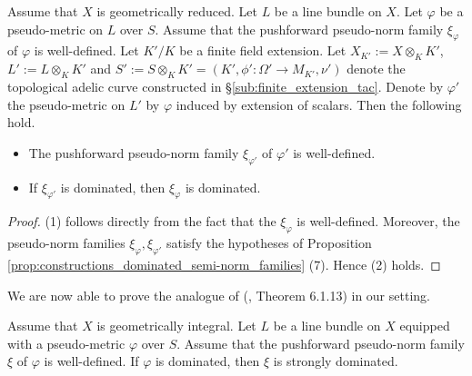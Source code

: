 \documentclass [11pt,reqno]{amsart}
\newcommand{\1}{\mathmybb{1}}
\begin{document}
\begin{proposition}
\label{prop:CM_4.1.18}
Assume that $X$ is geometrically reduced. Let $L$ be a line bundle on $X$. Let $\varphi$ be a pseudo-metric on $L$ over $S$. Assume that the pushforward pseudo-norm family $\xi_{\varphi}$ of $\varphi$ is well-defined. Let $K'/K$ be a finite field extension. Let $X_{K'}:=X \otimes_{K} K'$, $L':=L\otimes_{K}K'$ and $S' := S \otimes_{K} K'=(K',\phi':\Omega' \to M_{K'},\nu')$ denote the topological adelic curve constructed in \S \ref{sub:finite_extension_tac}. Denote by $\varphi'$ the pseudo-metric on $L'$ by $\varphi$ induced by extension of scalars. Then the following hold.
\begin{itemize}
	\item[(1)] The pushforward pseudo-norm family $\xi_{\varphi'}$ of $\varphi'$ is well-defined.
	\item[(2)] If $\xi_{\varphi'}$ is dominated, then $\xi_{\varphi}$ is dominated.
\end{itemize}
\end{proposition}

\begin{proof}
(1) follows directly from the fact that the $\xi_{\varphi}$ is well-defined. Moreover, the pseudo-norm families $\xi_{\varphi},\xi_{\varphi'}$ satisfy the hypotheses of Proposition \ref{prop:constructions_dominated_semi-norm_families} (7). Hence (2) holds.
\end{proof}

We are now able to prove the analogue of (\cite{ChenMori}, Theorem 6.1.13) in our setting.

\begin{theorem}
\label{th:pushforward_pseudo-metric_family_dominated_general}
Assume that $X$ is geometrically integral. Let $L$ be a line bundle on $X$ equipped with a pseudo-metric $\varphi$ over $S$. Assume that the pushforward pseudo-norm family $\xi$ of $\varphi$ is well-defined. If $\varphi$ is dominated, then $\xi$ is strongly dominated. 
\end{theorem}
\end{document}
